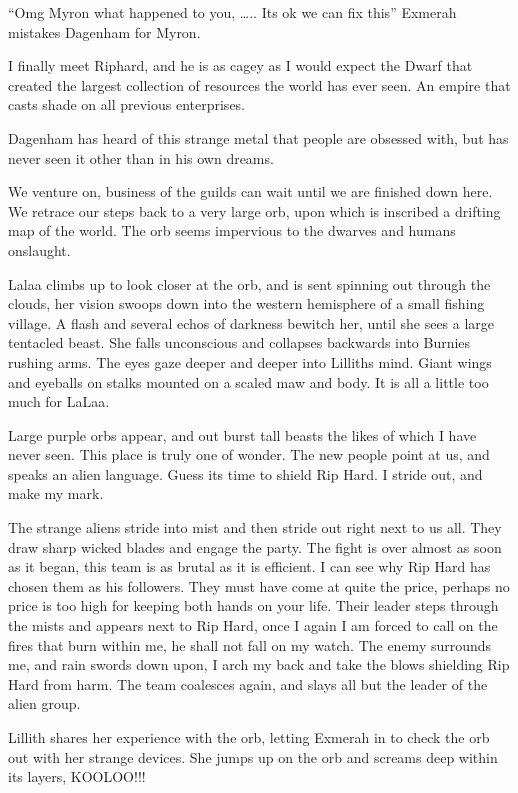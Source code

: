 “Omg Myron what happened to you, ….. Its ok we can fix this” Exmerah mistakes Dagenham for Myron.\medskip

I finally meet Riphard, and he is as cagey as I would expect the Dwarf that created the largest collection of resources the world has ever seen. An empire that casts shade on all previous enterprises.\medskip

Dagenham has heard of this strange metal that people are obsessed with, but has never seen it other than in his own dreams.\medskip

We venture on, business of the guilds can wait until we are finished down here. We retrace our steps back to a very large orb, upon which is inscribed a drifting map of the world. The orb seems impervious to the dwarves and humans onslaught.\medskip

Lalaa climbs up to look closer at the orb, and is sent spinning out through the clouds, her vision swoops down into the western hemisphere of a small fishing village. A flash and several echos of darkness bewitch her, until she sees a large tentacled beast. She falls unconscious and collapses backwards into Burnies rushing arms. The eyes gaze deeper and deeper into Lilliths mind. Giant wings and eyeballs on stalks mounted on a scaled maw and body. It is all a little too much for LaLaa.\medskip

Large purple orbs appear, and out burst tall beasts the likes of which I have never seen. This place is truly one of wonder. The new people point at us, and speaks an alien language. Guess its time to shield Rip Hard. I stride out, and make my mark.\medskip

The strange aliens stride into mist and then stride out right next to us all. They draw sharp wicked blades and engage the party. The fight is over almost as soon as it began, this team is as brutal as it is efficient. I can see why Rip Hard has chosen them as his followers. They must have come at quite the price, perhaps no price is too high for keeping both hands on your life. Their leader steps through the mists and appears next to Rip Hard, once I again I am forced to call on the fires that burn within me, he shall not fall on my watch. The enemy surrounds me, and rain swords down upon, I arch my back and take the blows shielding Rip Hard from harm. The team coalesces again, and slays all but the leader of the alien group.\medskip

Lillith shares her experience with the orb, letting Exmerah in to check the orb out with her strange devices. She jumps up on the orb and screams deep within its layers, KOOLOO!!!\medskip

